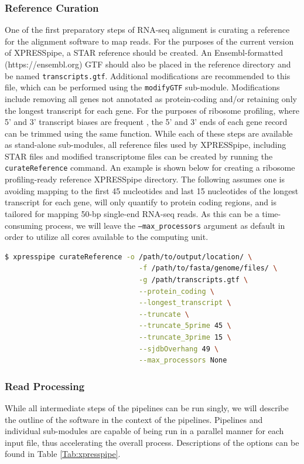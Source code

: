 \documentclass[11pt, a4paper, oneside]{article}
\begin{document}
\subsubsection{Reference Curation}
One of the first preparatory steps of RNA-seq alignment is curating a reference for the alignment software to map reads. For the purposes of the current version of XPRESSpipe, a STAR \cite{star} reference should be created. An Ensembl-formatted (https://ensembl.org) GTF should also be placed in the reference directory and be named \texttt{transcripts.gtf}. Additional modifications are recommended to this file, which can be performed using the \texttt{modifyGTF} sub-module. Modifications include removing all genes not annotated as protein-coding and/or retaining only the longest transcript for each gene. For the purposes of ribosome profiling, where 5' and 3' transcript biases are frequent \cite{ingolia_meth, weinberg_reports}, the 5' and 3' ends of each gene record can be trimmed using the same function. While each of these steps are available as stand-alone sub-modules, all reference files used by XPRESSpipe, including STAR files and modified transcriptome files can be created by running the \texttt{curateReference} command. An example is shown below for creating a ribosome profiling-ready reference XPRESSpipe directory. The following assumes one is avoiding mapping to the first 45 nucleotides and last 15 nucleotides of the longest transcript for each gene, will only quantify to protein coding regions, and is tailored for mapping 50-bp single-end RNA-seq reads. As this can be a time-consuming process, we will leave the \texttt{--max\_processors} argument as default in order to utilize all cores available to the computing unit.
\newline
\begin{lstlisting}[language=bash, caption=curateReference example]
$ xpresspipe curateReference -o /path/to/output/location/ \
                                -f /path/to/fasta/genome/files/ \
                                -g /path/transcripts.gtf \
                                --protein_coding \
                                --longest_transcript \
                                --truncate \
                                --truncate_5prime 45 \
                                --truncate_3prime 15 \
                                --sjdbOverhang 49 \
                                --max_processors None
\end{lstlisting}

\subsubsection{Read Processing}
While all intermediate steps of the pipelines can be run singly, we will describe the outline of the software in the context of the pipelines. Pipelines and individual sub-modules are capable of being run in a parallel manner for each input file, thus accelerating the overall process. Descriptions of the options can be found in Table \ref{Tab:xpresspipe}.
\end{document}
